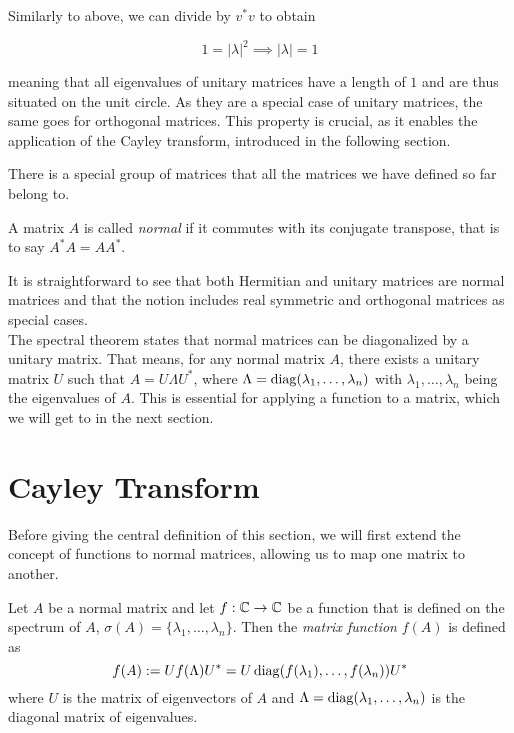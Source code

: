Similarly to above, we can divide by $v^* v$ to obtain

\[
    1 = \left| \lambda \right|^2 \implies \left| \lambda \right| = 1
\]

meaning that all eigenvalues of unitary matrices have a length of $1$ and are thus situated on the unit circle.
As they are a special case of unitary matrices, the same goes for orthogonal matrices.
This property is crucial, as it enables the application of the Cayley transform,
introduced in the following section.

There is a special group of matrices that all the matrices we have defined so far belong to.

\begin{definition}
    A matrix $A$ is called \emph{normal} if it commutes with its conjugate transpose,
    that is to say $A^* A = A A^*$.
\end{definition}

It is straightforward to see that both Hermitian and unitary matrices are normal matrices
and that the notion includes real symmetric and orthogonal matrices as special cases.\\
The spectral theorem states that normal matrices can be diagonalized by a unitary matrix.
That means, for any normal matrix $A$, there exists a unitary matrix $U$ such that $A = U \Lambda U^*$,
where $\Lambda = \operatorname{diag}(\lambda_1, \ldots, \lambda_n)$ with $\lambda_1, \ldots, \lambda_n$ being the eigenvalues of $A$.
This is essential for applying a function to a matrix, which we will get to in the next section.

\section{Cayley Transform}

Before giving the central definition of this section,
we will first extend the concept of functions to normal matrices,
allowing us to map one matrix to another.

\begin{definition}
    Let $A$ be a normal matrix and let $f: \mathbb{C} \to \mathbb{C}$ be a function that is defined on the spectrum of $A$,
    $\sigma(A) = \{\lambda_1, \ldots, \lambda_n\}$.
    Then the \emph{matrix function} $f(A)$ is defined as
    \[
    f(A) := U f(\Lambda) U^* = U \operatorname{diag}(f(\lambda_1), \ldots, f(\lambda_n)) U^*
    \]
    where $U$ is the matrix of eigenvectors of $A$ and $\Lambda = \operatorname{diag}(\lambda_1, \ldots, \lambda_n)$ is the diagonal matrix of eigenvalues.
\end{definition}

